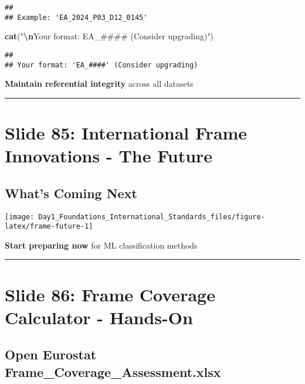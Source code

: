 \documentclass[
]{article}
\newenvironment{Shaded}{\begin{snugshade}}{\end{snugshade}}
\newcommand{\FunctionTok}[1]{\textcolor[rgb]{0.13,0.29,0.53}{\textbf{#1}}}
\newcommand{\NormalTok}[1]{#1}
\newcommand{\SpecialCharTok}[1]{\textcolor[rgb]{0.81,0.36,0.00}{\textbf{#1}}}
\newcommand{\StringTok}[1]{\textcolor[rgb]{0.31,0.60,0.02}{#1}}
\begin{document}
\begin{verbatim}
## 
## Example: 'EA_2024_P03_D12_0145'
\end{verbatim}

\begin{Shaded}
\begin{Highlighting}[]
\FunctionTok{cat}\NormalTok{(}\StringTok{"}\SpecialCharTok{\textbackslash{}n}\StringTok{Your format: \textquotesingle{}EA\_\#\#\#\#\textquotesingle{} (Consider upgrading)"}\NormalTok{)}
\end{Highlighting}
\end{Shaded}

\begin{verbatim}
## 
## Your format: 'EA_####' (Consider upgrading)
\end{verbatim}

\textbf{Maintain referential integrity} across all datasets

\begin{center}\rule{0.5\linewidth}{0.5pt}\end{center}

\section{Slide 85: International Frame Innovations - The
Future}\label{slide-85-international-frame-innovations---the-future}

\subsection{What's Coming Next}\label{whats-coming-next}

\texttt{[image: Day1\_Foundations\_International\_Standards\_files/figure-latex/frame-future-1]}

\textbf{Start preparing now} for ML classification methods

\begin{center}\rule{0.5\linewidth}{0.5pt}\end{center}

\section{Slide 86: Frame Coverage Calculator -
Hands-On}\label{slide-86-frame-coverage-calculator---hands-on}

\subsection{Open Eurostat
Frame\_Coverage\_Assessment.xlsx}\label{open-eurostat-frame_coverage_assessment.xlsx}
\end{document}
